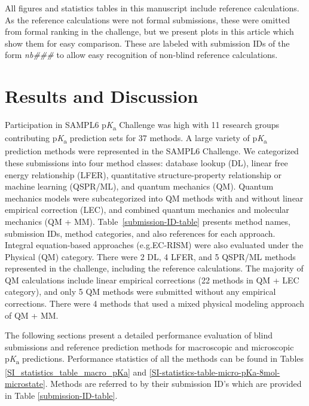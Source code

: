 \documentclass[9pt,lineno,final]{elife}
\newcommand{\pKa}{p\textit{K}\textsubscript{a}}
\begin{document}
All figures and statistics tables in this manuscript include reference calculations. 
As the reference calculations were not formal submissions, these were omitted from formal ranking in the challenge, but we present plots in this article which show them for easy comparison. These are labeled with submission IDs of the form \textit{nb\#\#\#} to allow easy recognition of non-blind reference calculations.


\section{Results and Discussion}


Participation in SAMPL6 \pKa{} Challenge was high with 11 research groups contributing \pKa{} prediction sets for 37 methods.  
A large variety of \pKa{} prediction methods were represented in the SAMPL6 Challenge. 
We categorized these submissions into four method classes: database lookup (DL), linear free energy relationship (LFER), quantitative structure-property relationship or machine learning (QSPR/ML), and quantum mechanics (QM). 
Quantum mechanics models were subcategorized into QM methods with and without linear empirical correction (LEC), and combined quantum mechanics and molecular mechanics (QM + MM). 
Table~\ref{submission-ID-table} presents method names, submission IDs, method categories, and also references for each approach. 
Integral equation-based approaches (e.g.EC-RISM) were also evaluated under the Physical (QM) category. There were 2 DL, 4 LFER, and 5 QSPR/ML methods represented in the challenge, including the reference calculations. 
The majority of QM calculations include linear empirical corrections (22 methods in QM + LEC category), and only 5 QM methods were submitted without any empirical corrections. 
There were 4 methods that used a mixed physical modeling approach of QM + MM. 

The following sections present a detailed performance evaluation of blind submissions and reference prediction methods for macroscopic and microscopic \pKa{} predictions. Performance statistics of all the methods can be found in Tables \ref{SI_statistics_table_macro_pKa} and \ref{SI-statistics-table-micro-pKa-8mol-microstate}. Methods are referred to by their submission ID's which are provided in Table \ref{submission-ID-table}.
\end{document}
